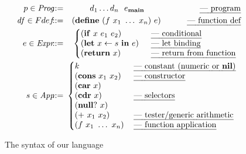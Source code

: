 \documentclass[9pt,preprint,nonatbib]{sigplanconf}
\newcommand{\ID}{\mbox{$\mathbf{ id}$}}
\begin{document}
\begin{figure}[t]\footnotesize
\renewcommand{\arraystretch}{0.9}
\begin{eqnarray*}
   p \in \mathit{Prog} & \!\!\!::=\!\!\! & d_1 \ldots d_n \,\,\,\, e_\mainpgm
   \hspace{5em} \,\,\,\,\,\,\,\,\,\; \mbox{\em --- program}\\
    \mathit{df} \in Fdef & \!\!\!::=\!\!\! & (\DEFINE\,\, (f\,\, x_1 \,\, \ldots
\,\,x_n)\,\,
    e)
    \hspace{0.2em} \ \ \ \ \ \ \ \ \  \mbox{\em --- function def} \\
e \in \mathit{Expr} & \!\!\!::=\!\!\! &
\left\{\begin{array}{@{}ll@{\hspace{1em}}l}
       (\SIF\,\, x\,\, e_1\,\, e_2) && \!\!\!\mbox{\em --- conditional} \\
       (\LET\,\, x \leftarrow s\,\, \IN\,\, e) &&\!\!\! \mbox{\em --- let
binding} \\
       (\SRETURN\,\, x) && \!\!\!\mbox{\em --- return from function}
    \end{array}\right. \\
s \in \mathit{App} & \!\!\!::=\!\!\!  &
\left\{\begin{array}{@{}l@{\hspace{1.2em}}l}
       k & \mbox{\em --- constant (numeric or $\NIL$)}\\
       (\CONS\,\, x_1\,\, x_2) & \mbox{\em --- constructor} \\
       (\CAR\,\, x) & \\
       (\CDR\,\, x) & \mbox{\em --- selectors} \\
       (\NULLQ\,\, x) & \\
       (\PRIM\,\, x_1\,\, x_2) & \mbox{\em ---  tester/generic arithmetic} \\
       (f\,\, x_1\,\,\ldots\,\, x_n) & \mbox{\em --- function application}
    \end{array}\right.
\end{eqnarray*}
  \caption{The syntax of our language}\label{fig:lang-syntax}
\normalsize
\end{figure}
\end{document}

